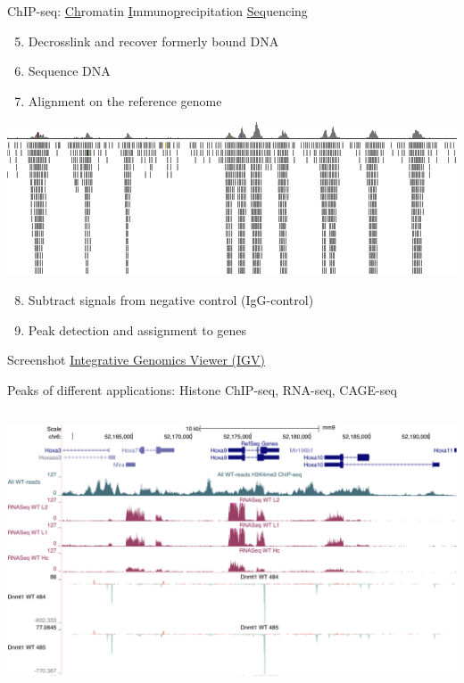 \documentclass[10pt]{beamer}
\newcommand{\credit}[1]{{\vspace{\fill} \par \raggedleft \scriptsize \mdseries \color{mDarkBrown} #1 \par}}
\begin{document}
\begin{frame}{ChIP-seq: \underline{Ch}romatin \underline{I}mmuno\underline{p}recipitation \underline{Seq}uencing}
	\begin{enumerate}
		\setcounter{enumi}{4}
		\item Decrosslink and recover formerly bound DNA
		\item Sequence DNA
		\item Alignment on the reference genome
	\end{enumerate}
	\begin{center}
		\includegraphics[width=\textwidth]{./figures/igvpeaks.png}
	\end{center}
	\begin{enumerate}
		\setcounter{enumi}{7}
		\item Subtract signals from negative control (IgG-control)
		\item Peak detection and assignment to genes
	\end{enumerate}
	\credit{Screenshot \href{https://igv.org/doc/desktop/}{Integrative Genomics Viewer (IGV)}}
\end{frame}

\begin{frame}{Peaks of different applications: Histone ChIP-seq, RNA-seq,  CAGE-seq}
	\begin{columns}[T]
		\column{\dimexpr\paperwidth-10pt}
		\includegraphics[width=\textwidth]{./figures/peaks.png}
	\end{columns}
\end{frame}
\end{document}
